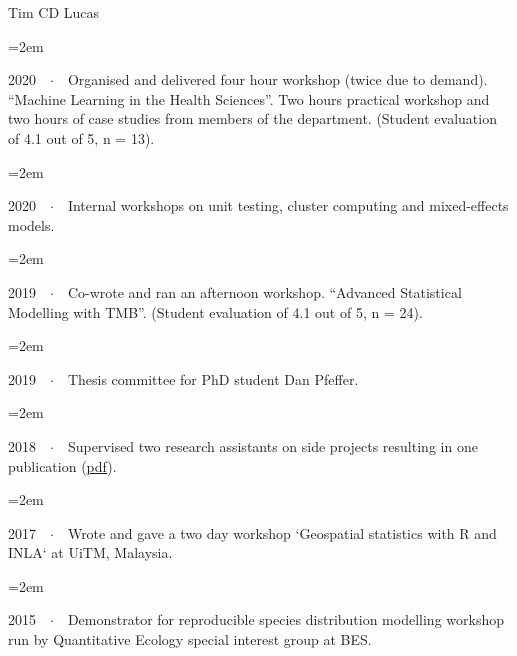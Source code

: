 \documentclass{scrartcl}
\newcommand{\Description}[1]{\hangindent=2em\hangafter=0\noindent\raggedright\footnotesize{#1}\par\normalsize\vspace{1em}} %
\begin{document}
\begin{cv}{Tim {\Large CD} Lucas}
{\color{Maroon}}\vspace{1em}


\Description{2020\ \ $\cdotp$\ \ Organised and delivered four hour workshop (twice due to demand).  ``Machine Learning in the Health Sciences''. Two hours practical workshop and two hours of case studies from members of the department. (Student evaluation of 4.1 out of 5, n = 13).}
\vspace{-0.5em} %

\Description{2020\ \ $\cdotp$\ \ Internal workshops on unit testing, cluster computing and mixed-effects models.}
\vspace{-0.5em} %

\Description{2019\ \ $\cdotp$\ \ Co-wrote and ran an afternoon workshop. ``Advanced Statistical Modelling with TMB''. (Student evaluation of 4.1 out of 5, n = 24).}
\vspace{-0.5em} %

\Description{2019\ \ $\cdotp$\ \ Thesis committee for PhD student Dan Pfeffer.}
\vspace{-0.5em} %

\Description{2018\ \ $\cdotp$\ \ Supervised two research assistants on side projects resulting in one publication (\href{https://malariajournal.biomedcentral.com/track/pdf/10.1186/s12936-018-2500-5}{pdf}).}
\vspace{-0.5em} %

\Description{2017\ \ $\cdotp$\ \ Wrote and gave a two day workshop `Geospatial statistics with R and INLA` at UiTM, Malaysia.}
\vspace{-0.5em} %


\Description{2015\ \ $\cdotp$\ \ Demonstrator for reproducible species distribution modelling workshop run by Quantitative Ecology special interest group at BES.}
\vspace{-0.5em} %


\end{cv}
\end{document}
